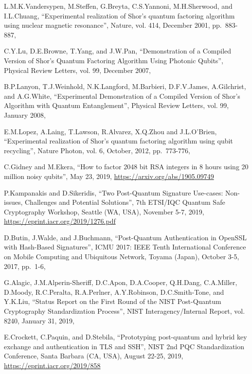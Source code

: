 \documentclass[a4paper,12pt]{article}
\begin{document}
\begin{thebibliography}{99}
L.M.K.Vandersypen, M.Steffen, G.Breyta, C.S.Yannoni, M.H.Sherwood, and I.L.Chuang,
``Experimental realization of Shor's quantum factoring algorithm using nuclear magnetic resonance'',
Nature,
vol. 414,
December 2001,
pp.~883-887,

C.Y.Lu, D.E.Browne, T.Yang, and J.W.Pan,
``Demonstration of a Compiled Version of Shor's Quantum Factoring Algorithm Using Photonic Qubits'',
Physical Review Letters,
vol. 99,
December 2007,

B.P.Lanyon, T.J.Weinhold, N.K.Langford, M.Barbieri, D.F.V.James, A.Gilchrist, and A.G.White,
``Experimental Demonstration of a Compiled Version of Shor's Algorithm with Quantum Entanglement'',
Physical Review Letters,
vol. 99,
January 2008,

E.M.Lopez, A.Laing, T.Lawson, R.Alvarez, X.Q.Zhou and J.L.O'Brien,
``Experimental realization of Shor's quantum factoring algorithm using qubit recycling'',
Nature Photon,
vol. 6,
October, 2012,
pp.~773-776,

C.Gidney and M.Ekera,
``How to factor 2048 bit RSA integers in 8 hours using 20 million noisy qubits'',
May 23, 2019,
\url{https://arxiv.org/abs/1905.09749}

P.Kampanakis and D.Sikeridis,
``Two Post-Quantum Signature Use-cases:
Non-issues, Challenges and Potential Solutions'',
7th ETSI/IQC Quantum Safe Cryptography Workshop, 
Seattle (WA, USA),
November 5-7, 2019,
\url{https://eprint.iacr.org/2019/1276.pdf}

D.Butin, J.Walde, and J.Buchmann,
``Post-Quantum Authentication in OpenSSL with
Hash-Based Signatures'',
ICMU 2017: IEEE Tenth International Conference on Mobile Computing and Ubiquitous Network,
Toyama (Japan),
October 3-5, 2017,
pp.~1-6,

G.Alagic, J.M.Alperin-Sheriff, D.C.Apon, D.A.Cooper, Q.H.Dang, C.A.Miller, D.Moody, R.C.Peralta, R.A.Perlner, A.Y.Robinson, D.C.Smith-Tone, and Y.K.Liu,
``Status Report on the First Round of the NIST Post-Quantum Cryptography Standardization Process'',
NIST Interagency/Internal Report,
vol. 8240,
January 31, 2019,

E.Crockett, C.Paquin, and D.Stebila,
``Prototyping post-quantum and hybrid key exchange and authentication in TLS and SSH'',
NIST 2nd PQC Standardization Conference,
Santa Barbara (CA, USA),
August 22-25, 2019,
\url{https://eprint.iacr.org/2019/858}


\end{thebibliography}
\end{document}
